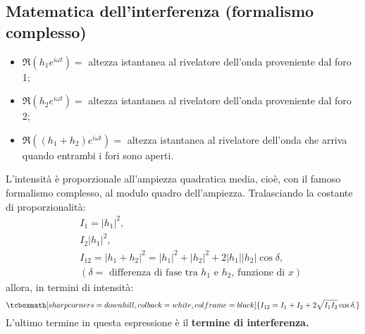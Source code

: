 \documentclass[a4paper,12pt,oneside]{book}
\begin{document}
\subsection*{Matematica dell'interferenza (formalismo complesso)}
\begin{itemize}
\item $\Re{\left(h_1 e^{i\omega t} \right)}=$ altezza istantanea al rivelatore dell'onda proveniente dal foro 1;
\item $\Re{\left(h_2 e^{i\omega t} \right)}=$ altezza istantanea al rivelatore dell'onda proveniente dal foro 2;
\item $\Re{\left( \left(h_1 +h_2 \right) e^{i\omega t} \right)}=$ altezza istantanea al rivelatore dell'onda che arriva quando entrambi i fori sono aperti.
\end{itemize}
L'intensità è proporzionale all'ampiezza quadratica media, cioè, con il famoso formalismo complesso, al modulo quadro dell'ampiezza. Tralasciando la costante di proporzionalità:
\begin{eqnarray}
& &I_1= \lvert {h_1} \rvert ^2, \nonumber \\
& &I_2 \lvert {h_1} \rvert ^2, \\
& &I_{12}= \lvert {h_1+h_2} \rvert ^2= \lvert {h_1} \rvert ^2+ \lvert {h_2} \rvert ^2 + 2 \lvert {h_1} \rvert \lvert {h_2} \rvert \cos \delta ,\nonumber  \\ 
& &\left( \delta = \textrm{ differenza di fase tra } h_1 \textrm{ e } h_2 \textrm{, funzione di }x \right)\nonumber 
\end{eqnarray}
allora, in termini di intensità:
	\begin{equation}
		\tcboxmath[sharp corners=downhill, colback=white, colframe=black]{
			I_{12}= I_1 + I_2 + 2 \sqrt{I_1 I_2}\cos \delta.
			}
	\end{equation}
L'ultimo termine in questa espressione è il \textbf{termine di interferenza.}
\end{document}
